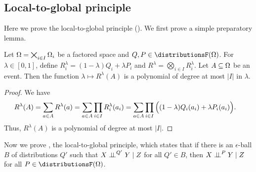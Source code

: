\documentclass[USenglish,onecolumn]{article}
\begin{document}
\subsection{Local-to-global principle}
\label{sec:local_to_global}
Here we prove the local-to-global principle (). We first prove a simple preparatory lemma.


\begin{lemma}
  \label{lemma:obtain_polynomial}
  Let $\Omega = \bigtimes_{i\in I}\Omega_i$ be a factored space and $Q, P \in \distributionsF(\Omega)$.
  For $\lambda \in [0, 1]$, define $R^{\lambda}_i = (1 - \lambda) Q_i + \lambda P_i$ and $R^{\lambda} = \bigotimes_{i \in I} R^{\lambda}_i$.
  Let $A \subseteq \Omega$ be an event.
  Then the function $\lambda \mapsto R^{\lambda}(A)$ is a polynomial of degree at most $|I|$ in $\lambda$.
\end{lemma}

\begin{proof}
  We have
  \begin{align*}
    R^\lambda(A) &= \sum_{a \in A} R^{\lambda}(a)
    = \sum_{a \in A} \prod_{{i\in I}} R^{\lambda}_{i}(a_i)
    =  \sum_{a\in A}\prod_{i\in I} \Big( (1-\lambda)Q_i(a_i) + \lambda P_i(a_i) \Big).
  \end{align*}
  Thus, $R^\lambda(A)$ is a polynomial of degree at most $|I|$.
\end{proof}

Now we prove , the local-to-global principle, which states that if there is an $\epsilon$-ball $B$ of distributions $Q'$ such that $X\mathrel{\perp\!\!\!\perp}^{Q'}Y\mid Z$ for all $Q'\in B$, then $X\mathrel{\perp\!\!\!\perp}^{P}Y\mid Z$ for all $P\in\distributionsF(\Omg)$.
\end{document}
